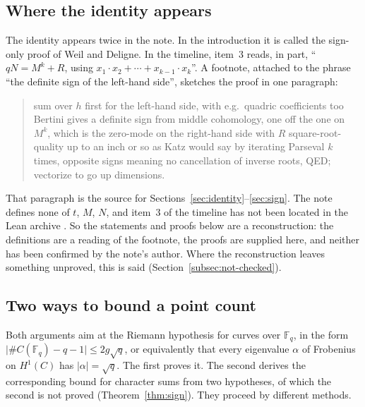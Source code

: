 \documentclass[11pt]{amsbook}
\theoremstyle{plain}
\theoremstyle{definition}
\theoremstyle{remark}
\numberwithin{equation}{section}
\numberwithin{figure}{chapter}
\numberwithin{table}{chapter}
\newcommand{\F}{\mathbb{F}}
\begin{document}
\subsection{Where the identity appears}\label{sec:source}

The identity appears twice in the note. In the introduction it is
called the sign-only proof of Weil and Deligne. In the timeline,
item~3 reads, in part, ``$qN = M^k + R$, using
$x_1 \cdot x_2 + \cdots + x_{k-1}\cdot x_k$''. A footnote, attached
to the phrase ``the definite sign of the left-hand side'', sketches
the proof in one paragraph:
\begin{quote}
sum over $h$ first for the left-hand side, with e.g.\ quadric
coefficients too Bertini gives a definite sign from middle
cohomology, one off the one on $M^k$, which is the zero-mode on the
right-hand side with $R$ square-root-quality up to an inch or so as
Katz would say by iterating Parseval $k$ times, opposite signs
meaning no cancellation of inverse roots, QED; vectorize to go up
dimensions.
\end{quote}
That paragraph is the source for
Sections~\ref{sec:identity}--\ref{sec:sign}. The note defines none
of $t$, $M$, $N$, and item~3 of the timeline has not been located
in the Lean archive \cite{AlpogeArchive2026}. So the statements and
proofs below are a reconstruction: the definitions are a reading of
the footnote, the proofs are supplied here, and neither has been
confirmed by the note's author. Where the reconstruction leaves
something unproved, this is said
(Section~\ref{subsec:not-checked}).

\subsection{Two ways to bound a point count}\label{sec:two-ways}

Both arguments aim at the Riemann hypothesis for curves over
$\F_q$, in the form
$\bigl|\#C(\F_q) - q - 1\bigr| \le 2g\sqrt q$, or equivalently that
every eigenvalue $\alpha$ of Frobenius on $H^1(C)$ has
$|\alpha| = \sqrt q$. The first proves it. The second derives the
corresponding bound for character sums from two hypotheses, of
which the second is not proved (Theorem~\ref{thm:sign}). They
proceed by different methods.
\end{document}
